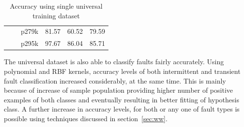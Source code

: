 \begin{table}[h]
{\begin{tabular}{cccccc}
                            &                                                 & p279k                    & 81.57            & 60.52         & 79.59                      \\
                            &                                                 & p295k                    & 97.67            & 86.04         & 85.71     \\
\hline                
\end{tabular}
}
\caption{Accuracy using single universal training dataset}
\label{tab:universal}
\end{table}

The universal dataset is also able to classify faults fairly accurately. Using polynomial and RBF kernels, accuracy levels of both intermittent and transient fault classification increased considerably, at the same time. This is mainly because of increase of sample population providing  higher number of positive examples of both classes and eventually resulting in better fitting of hypothesis class. A further increase in accuracy levels, for both or any one of fault types is possible using techniques discussed in section~\ref{sec:ww}.


